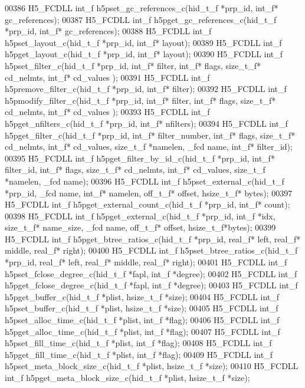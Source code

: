 \begin{DoxyCode}
00386 H5\_FCDLL int\_f h5pset\_gc\_references\_c(hid\_t\_f *prp\_id, int\_f* gc\_references);
00387 H5\_FCDLL int\_f h5pget\_gc\_references\_c(hid\_t\_f *prp\_id, int\_f* gc\_references);
00388 H5\_FCDLL int\_f h5pset\_layout\_c(hid\_t\_f *prp\_id, int\_f* layout);
00389 H5\_FCDLL int\_f h5pget\_layout\_c(hid\_t\_f *prp\_id, int\_f* layout);
00390 H5\_FCDLL int\_f h5pset\_filter\_c(hid\_t\_f *prp\_id, int\_f* filter, int\_f* flags, size\_t\_f* cd\_nelmts, int\_f* 
      cd\_values );
00391 H5\_FCDLL int\_f h5premove\_filter\_c(hid\_t\_f *prp\_id, int\_f* filter);
00392 H5\_FCDLL int\_f h5pmodify\_filter\_c(hid\_t\_f *prp\_id, int\_f* filter, int\_f* flags, size\_t\_f* cd\_nelmts, int\_f*
       cd\_values );
00393 H5\_FCDLL int\_f h5pget\_nfilters\_c(hid\_t\_f *prp\_id, int\_f* nfilters);
00394 H5\_FCDLL int\_f h5pget\_filter\_c(hid\_t\_f *prp\_id, int\_f* filter\_number, int\_f* flags, size\_t\_f* cd\_nelmts, 
      int\_f* cd\_values, size\_t\_f *namelen, \_fcd name, int\_f* filter\_id);
00395 H5\_FCDLL int\_f h5pget\_filter\_by\_id\_c(hid\_t\_f *prp\_id, int\_f* filter\_id, int\_f* flags, size\_t\_f* cd\_nelmts, 
      int\_f* cd\_values, size\_t\_f *namelen, \_fcd name);
00396 H5\_FCDLL int\_f h5pset\_external\_c(hid\_t\_f *prp\_id, \_fcd name, int\_f* namelen, off\_t\_f* offset, hsize\_t\_f*
      bytes);
00397 H5\_FCDLL int\_f h5pget\_external\_count\_c(hid\_t\_f *prp\_id, int\_f* count);
00398 H5\_FCDLL int\_f h5pget\_external\_c(hid\_t\_f *prp\_id, int\_f *idx, size\_t\_f* name\_size, \_fcd name, off\_t\_f* 
      offset, hsize\_t\_f*bytes);
00399 H5\_FCDLL int\_f h5pget\_btree\_ratios\_c(hid\_t\_f *prp\_id, real\_f* left, real\_f* middle, real\_f* right);
00400 H5\_FCDLL int\_f h5pset\_btree\_ratios\_c(hid\_t\_f *prp\_id, real\_f* left, real\_f* middle, real\_f* right);
00401 H5\_FCDLL int\_f h5pset\_fclose\_degree\_c(hid\_t\_f *fapl, int\_f *degree);
00402 H5\_FCDLL int\_f h5pget\_fclose\_degree\_c(hid\_t\_f *fapl, int\_f *degree);
00403 H5\_FCDLL int\_f h5pget\_buffer\_c(hid\_t\_f *plist, hsize\_t\_f *size);
00404 H5\_FCDLL int\_f h5pset\_buffer\_c(hid\_t\_f *plist, hsize\_t\_f *size);
00405 H5\_FCDLL int\_f h5pset\_alloc\_time\_c(hid\_t\_f *plist, int\_f *flag);
00406 H5\_FCDLL int\_f h5pget\_alloc\_time\_c(hid\_t\_f *plist, int\_f *flag);
00407 H5\_FCDLL int\_f h5pset\_fill\_time\_c(hid\_t\_f *plist, int\_f *flag);
00408 H5\_FCDLL int\_f h5pget\_fill\_time\_c(hid\_t\_f *plist, int\_f *flag);
00409 H5\_FCDLL int\_f h5pset\_meta\_block\_size\_c(hid\_t\_f *plist, hsize\_t\_f *size);
00410 H5\_FCDLL int\_f h5pget\_meta\_block\_size\_c(hid\_t\_f *plist, hsize\_t\_f *size);

\end{DoxyCode}

